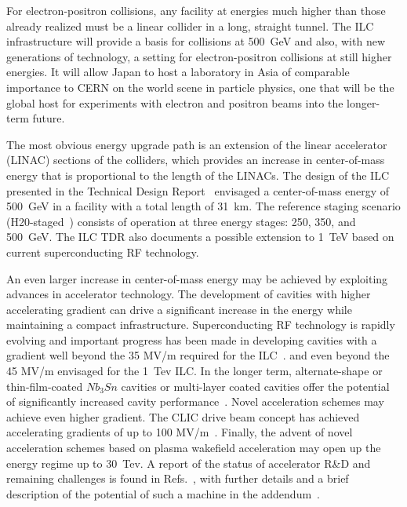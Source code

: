 For electron-positron collisions, any facility at energies much higher than
those already realized must be a linear collider in a long, straight tunnel.
The ILC infrastructure will provide a basis for collisions at 500~GeV and
also, with new generations of technology, a setting for electron-positron
collisions at still higher energies. It will allow Japan to host a laboratory
in Asia of comparable importance to CERN on the world scene in particle
physics, one that will be the global host for experiments with electron
and positron beams into the longer-term future.


The most obvious energy upgrade path is an extension of the linear
accelerator (LINAC) sections of the colliders, which provides an increase
in center-of-mass energy that is proportional to the length of the LINACs.
The design of the ILC presented in the Technical Design
Report~\cite{Behnke:2013xla,Adolphsen:2013jya,Adolphsen:2013kya} envisaged a
center-of-mass energy of 500~GeV{} in a facility with a total length of 31~km.
The reference staging scenario (H20-staged~\cite{Barklow:2015tja}) consists of operation at
three energy stages: 250, 350, and 500~GeV. The ILC TDR also documents
a possible extension to 1~TeV based on current superconducting RF technology. 



An even larger increase in center-of-mass energy may be achieved by
exploiting advances in accelerator technology. The development of
cavities with higher accelerating gradient can drive a significant
increase in the energy while maintaining a compact infrastructure.
Superconducting RF technology is rapidly evolving and important
progress has been made in developing cavities with a gradient well
beyond the 35 MV/m required for the ILC~\cite{Grassellino:2018tqg,Grassellino:2017bod}.
and even beyond the 45 MV/m envisaged for the 1~Tev{} ILC. In the longer term, alternate-shape
or thin-film-coated $Nb_3Sn$ cavities or multi-layer coated cavities offer the potential of
significantly increased cavity performance~\cite{Adolphsen:2013jya}.
Novel acceleration schemes may achieve even higher gradient. The CLIC drive beam concept has
achieved accelerating gradients of up to 100 MV/m~\cite{Aicheler:2012bya}.
Finally, the advent of novel acceleration schemes based on plasma wakefield acceleration
may open up the energy regime up to 30~Tev. A report of the status of accelerator R\&D and remaining
challenges is found in Refs.~\cite{advancedLC2020,advancedLC}, with further details and
a brief description of the potential of such a machine in the
addendum~\cite{advancedLCaddendum}.

